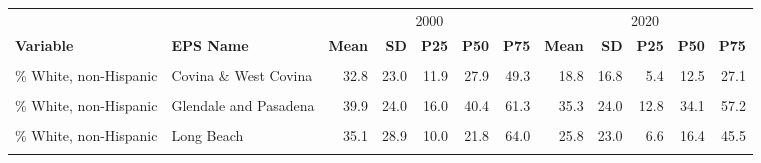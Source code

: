 \begin{table}[!h]
\centering
\begin{tabular}[t]{l|>{}l||r|r|r|r|r|r|r|r|r|r}
\hline
\multicolumn{2}{c|}{ } & \multicolumn{5}{c|}{2000} & \multicolumn{5}{c}{2020} \\
\cline{3-7} \cline{8-12}
\textbf{Variable} & \textbf{EPS Name} & \textbf{Mean} & \textbf{SD} & \textbf{P25} & \textbf{P50} & \textbf{P75} & \textbf{Mean} & \textbf{SD} & \textbf{P25} & \textbf{P50} & \textbf{P75}\\
\hline
\cellcolor{gray!6}{\% White, non-Hispanic} & \cellcolor{gray!6}{Anaheim} & \cellcolor{gray!6}{40.4} & \cellcolor{gray!6}{21.0} & \cellcolor{gray!6}{23.8} & \cellcolor{gray!6}{36.8} & \cellcolor{gray!6}{56.2} & \cellcolor{gray!6}{26.1} & \cellcolor{gray!6}{17.8} & \cellcolor{gray!6}{12.6} & \cellcolor{gray!6}{20.4} & \cellcolor{gray!6}{36.9}\\
\hline
\hline
\% White, non-Hispanic & Covina \& West Covina & 32.8 & 23.0 & 11.9 & 27.9 & 49.3 & 18.8 & 16.8 & 5.4 & 12.5 & 27.1\\
\hline
\cellcolor{gray!6}{\% White, non-Hispanic} & \cellcolor{gray!6}{East Los Angeles} & \cellcolor{gray!6}{10.3} & \cellcolor{gray!6}{11.5} & \cellcolor{gray!6}{2.9} & \cellcolor{gray!6}{6.2} & \cellcolor{gray!6}{11.8} & \cellcolor{gray!6}{6.5} & \cellcolor{gray!6}{7.1} & \cellcolor{gray!6}{2.0} & \cellcolor{gray!6}{4.1} & \cellcolor{gray!6}{8.4}\\
\hline
\% White, non-Hispanic & Glendale and Pasadena & 39.9 & 24.0 & 16.0 & 40.4 & 61.3 & 35.3 & 24.0 & 12.8 & 34.1 & 57.2\\
\hline
\cellcolor{gray!6}{\% White, non-Hispanic} & \cellcolor{gray!6}{Hollywood \& Wilshire} & \cellcolor{gray!6}{26.5} & \cellcolor{gray!6}{28.5} & \cellcolor{gray!6}{4.0} & \cellcolor{gray!6}{11.4} & \cellcolor{gray!6}{40.8} & \cellcolor{gray!6}{31.2} & \cellcolor{gray!6}{25.7} & \cellcolor{gray!6}{8.1} & \cellcolor{gray!6}{22.6} & \cellcolor{gray!6}{53.5}\\
\hline
\% White, non-Hispanic & Long Beach & 35.1 & 28.9 & 10.0 & 21.8 & 64.0 & 25.8 & 23.0 & 6.6 & 16.4 & 45.5\\
\hline
\cellcolor{gray!6}{\% White, non-Hispanic} & \cellcolor{gray!6}{Riverside, San Bernardino, \& Ontario} & \cellcolor{gray!6}{45.2} & \cellcolor{gray!6}{21.8} & \cellcolor{gray!6}{28.1} & \cellcolor{gray!6}{43.6} & \cellcolor{gray!6}{63.7} & \cellcolor{gray!6}{27.7} & \cellcolor{gray!6}{18.8} & \cellcolor{gray!6}{12.5} & \cellcolor{gray!6}{23.5} & \cellcolor{gray!6}{40.7}\\

\end{tabular}
\end{table}
